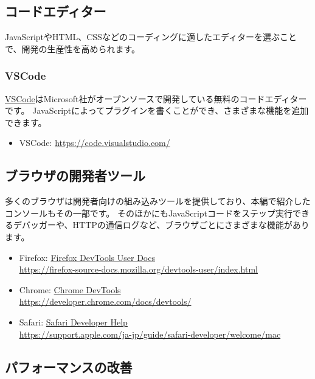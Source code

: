 \hypertarget{code-editor}{%
\subsection{コードエディター}\label{code-editor}}

JavaScriptやHTML、CSSなどのコーディングに適したエディターを選ぶことで、開発の生産性を高められます。

\hypertarget{vscode}{%
\subsubsection{VSCode}\label{vscode}}

\href{https://code.visualstudio.com/}{VSCode}はMicrosoft社がオープンソースで開発している無料のコードエディターです。
JavaScriptによってプラグインを書くことができ、さまざまな機能を追加できます。
\begin{itemize}
\item VSCode: \url{https://code.visualstudio.com/}
\end{itemize}

\hypertarget{browser-devtools}{%
\subsection{ブラウザの開発者ツール}\label{browser-devtools}}

多くのブラウザは開発者向けの組み込みツールを提供しており、本編で紹介したコンソールもその一部です。
そのほかにもJavaScriptコードをステップ実行できるデバッガーや、HTTPの通信ログなど、ブラウザごとにさまざまな機能があります。

\begin{itemize}
\item
  Firefox: \href{https://firefox-source-docs.mozilla.org/devtools-user/index.html}{Firefox DevTools User Docs}\\
  \url{https://firefox-source-docs.mozilla.org/devtools-user/index.html}
\item
  Chrome:
  \href{https://developer.chrome.com/docs/devtools/}{Chrome
  DevTools}\\
  \url{https://developer.chrome.com/docs/devtools/}
\item
  Safari:
  \href{https://support.apple.com/ja-jp/guide/safari-developer/welcome/mac}{Safari
  Developer Help}\\
  \url{https://support.apple.com/ja-jp/guide/safari-developer/welcome/mac}
\end{itemize}

\hypertarget{performance-improvement}{%
\subsection{パフォーマンスの改善}\label{performance-improvement}}

